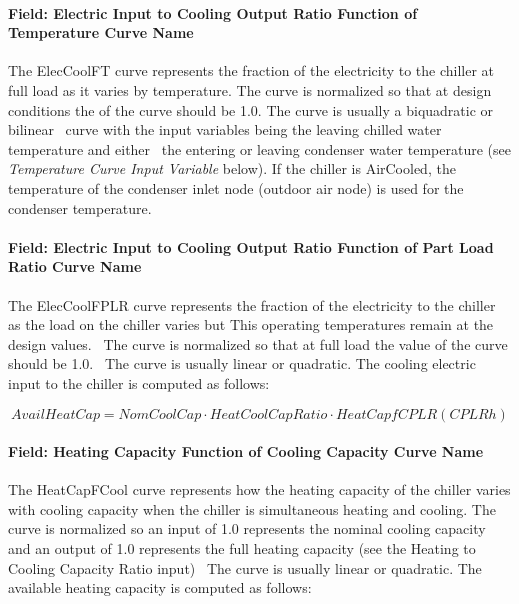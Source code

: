 \paragraph{Field: Electric Input to Cooling Output Ratio Function of Temperature Curve Name}\label{field-electric-input-to-cooling-output-ratio-function-of-temperature-curve-name-2}

The ElecCoolFT curve represents the fraction of the electricity to the chiller at full load as it varies by temperature. The curve is normalized so that at design conditions the of the curve should be 1.0. The curve is usually a biquadratic or bilinear~ curve with the input variables being the leaving chilled water temperature and either~ the entering or leaving condenser water temperature (see \emph{Temperature Curve Input Variable} below). If the chiller is AirCooled, the temperature of the condenser inlet node (outdoor air node) is used for the condenser temperature.

\paragraph{Field: Electric Input to Cooling Output Ratio Function of Part Load Ratio Curve Name}\label{field-electric-input-to-cooling-output-ratio-function-of-part-load-ratio-curve-name-2}

The ElecCoolFPLR curve represents the fraction of the electricity to the chiller as the load on the chiller varies but This operating temperatures remain at the design values.~ The curve is normalized so that at full load the value of the curve should be 1.0.~ The curve is usually linear or quadratic. The cooling electric input to the chiller is computed as follows:

\begin{equation}
    AvailHeatCap = NomCoolCap \cdot HeatCoolCapRatio \cdot HeatCapfCPLR(CPLRh)
\end{equation}

\paragraph{Field: Heating Capacity Function of Cooling Capacity Curve Name}\label{field-heating-capacity-function-of-cooling-capacity-curve-name}

The HeatCapFCool curve represents how the heating capacity of the chiller varies with cooling capacity when the chiller is simultaneous heating and cooling. The curve is normalized so an input of 1.0 represents the nominal cooling capacity and an output of 1.0 represents the full heating capacity (see the Heating to Cooling Capacity Ratio input)~ The curve is usually linear or quadratic. The available heating capacity is computed as follows:


